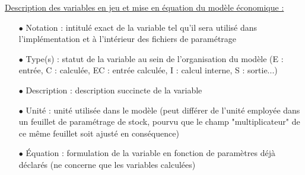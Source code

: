 \documentclass[12pt, colorinlistoftodos, notitlepage]{report}
\newenvironment{not used}[1]{%
    \longtable{%
        |>{\centering$\displaystyle}A{#1}{1}<{$}%
        |}\hline\ignorespaces}{%
    \endlongtable\ignorespacesafterend}
\begin{document}
\underline{Description des variables en jeu et mise en équation du modèle économique :}

\begin{itemize}
    \item[$\bullet$] Notation : intitulé exact de la variable tel qu'il sera utilisé dans l'implémentation et à l'intérieur des fichiers de paramétrage
    \item[$\bullet$] Type(s) : statut de la variable au sein de l'organisation du modèle (E : entrée, C : calculée, EC : entrée calculée, I : calcul interne, S : sortie...)
    \item[$\bullet$] Description : description succincte de la variable
    \item[$\bullet$] Unité : unité utilisée dans le modèle (peut différer de l'unité employée dans un feuillet de paramétrage de stock, pourvu que le champ "multiplicateur" de ce même feuillet soit ajusté en conséquence)
    \item[$\bullet$] Équation : formulation de la variable en fonction de paramètres déjà déclarés (ne concerne que les variables calculées)
\end{itemize}
\end{document}
